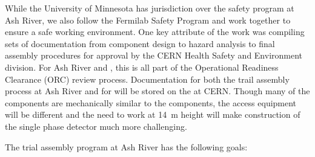 While the University of Minnesota has jurisdiction over the safety program at Ash River, we also follow the Fermilab Safety Program and work together to ensure a safe working environment.  
One key attribute of the  work was compiling sets of documentation from component design to hazard analysis to final assembly procedures for approval by the CERN Health Safety and Environment division. 
For Ash River and , this is all part of the Operational Readiness Clearance (ORC) review process. 
Documentation for both the trail assembly process at Ash River and for  will be stored on the  at CERN. 
Though many of the  components are mechanically similar to the  components, the access equipment will be different and the need to work at \SI{14}{m} height will make construction of the  single phase detector much more challenging.  


The   trial assembly program at Ash River has the following goals:

